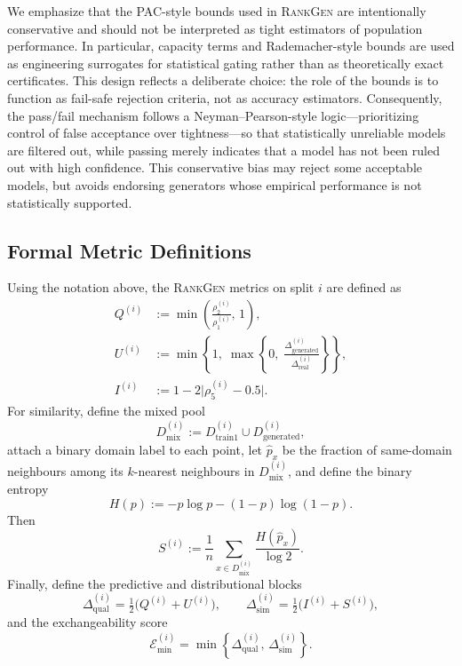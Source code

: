 We emphasize that the PAC-style bounds used in \textsc{RankGen} are intentionally
conservative and should not be interpreted as tight estimators of population
performance. In particular, capacity terms and Rademacher-style bounds are used
as engineering surrogates for statistical gating rather than as theoretically
exact certificates. This design reflects a deliberate choice: the role of the
bounds is to function as fail-safe rejection criteria, not as accuracy
estimators. Consequently, the pass/fail mechanism follows a Neyman--Pearson-style
logic---prioritizing control of false acceptance over tightness---so that
statistically unreliable models are filtered out, while passing merely indicates
that a model has not been ruled out with high confidence. This conservative bias
may reject some acceptable models, but avoids endorsing generators whose
empirical performance is not statistically supported.



\subsection{Formal Metric Definitions}

Using the notation above, the \textsc{RankGen} metrics on split $i$ are defined as
\begin{align}
Q^{(i)} &:= \min\!\left(\frac{\rho_2^{(i)}}{\rho_1^{(i)}},\,1\right),\\
U^{(i)} &:= \min\!\left\{1,\;\max\!\left\{0,\;\frac{\Delta_{\text{generated}}^{(i)}}{\Delta_{\text{real}}^{(i)}}\right\}\right\},\\
I^{(i)} &:= 1 - 2\bigl|\rho_5^{(i)} - 0.5\bigr|.
\end{align}
For similarity, define the mixed pool
\[
D_{\text{mix}}^{(i)} := D_{\text{train1}}^{(i)} \cup D_{\text{generated}}^{(i)},
\]
attach a binary domain label to each point, let $\hat p_x$ be the fraction of
same-domain neighbours among its $k$-nearest neighbours in $D_{\text{mix}}^{(i)}$,
and define the binary entropy
\[
H(p) := -p\log p -(1-p)\log(1-p).
\]
Then
\begin{equation}
S^{(i)} :=
\frac{1}{n}
\sum_{x\in D_{\text{mix}}^{(i)}}
\frac{H(\hat p_x)}{\log 2}.
\end{equation}
Finally, define the predictive and distributional blocks
\[
\Delta_{\text{qual}}^{(i)}=\tfrac12\bigl(Q^{(i)}+U^{(i)}\bigr),
\qquad
\Delta_{\text{sim}}^{(i)}=\tfrac12\bigl(I^{(i)}+S^{(i)}\bigr),
\]
and the exchangeability score
\begin{equation}
\mathcal{E}_{\min}^{(i)}
= \min\!\left\{\Delta_{\text{qual}}^{(i)},\,\Delta_{\text{sim}}^{(i)}\right\}.
\end{equation}

